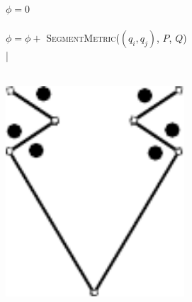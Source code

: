 \documentclass{beamer}
\begin{document}
	\begin{frame}
		\begin{sourcecode}
			\\
			$\phi = 0$\\
			\\
			\qquad$\phi = \phi + $ \textsc{SegmentMetric}($(q_i, q_j)$, $P$, $Q$)\\
			|\\
			\return{$\phi$}\\
			\qend
		\end{sourcecode}
	\end{frame}
	
	\begin{frame}
		\centering
		\def\svgwidth{0.7\textwidth}
		
	\end{frame}
	
	\begin{frame}
		\centering
		\includegraphics[width=0.5\textwidth]{img/example1.pdf}
	\end{frame}
	
	
\end{document}
